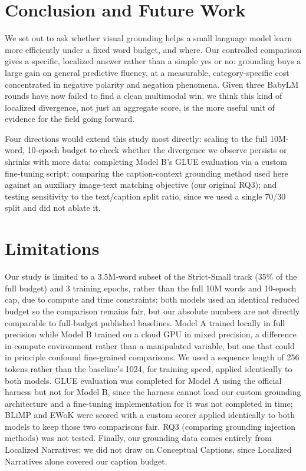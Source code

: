 \documentclass[11pt]{article}
\begin{document}
\section{Conclusion and Future Work}
\label{sec:conclusion}
We set out to ask whether visual grounding helps a small language model learn more efficiently under a fixed word budget, and where. Our controlled comparison gives a specific, localized answer rather than a simple yes or no: grounding buys a large gain on general predictive fluency, at a measurable, category-specific cost concentrated in negative polarity and negation phenomena. Given three BabyLM rounds have now failed to find a clean multimodal win, we think this kind of localized divergence, not just an aggregate score, is the more useful unit of evidence for the field going forward.

Four directions would extend this study most directly: scaling to the full 10M-word, 10-epoch budget to check whether the divergence we observe persists or shrinks with more data; completing Model B's GLUE evaluation via a custom fine-tuning script; comparing the caption-context grounding method used here against an auxiliary image-text matching objective (our original RQ3); and testing sensitivity to the text/caption split ratio, since we used a single 70/30 split and did not ablate it.

\section*{Limitations}
\label{sec:limitations}
Our study is limited to a 3.5M-word subset of the Strict-Small track (35\% of the full budget) and 3 training epochs, rather than the full 10M words and 10-epoch cap, due to compute and time constraints; both models used an identical reduced budget so the comparison remains fair, but our absolute numbers are not directly comparable to full-budget published baselines. Model A trained locally in full precision while Model B trained on a cloud GPU in mixed precision, a difference in compute environment rather than a manipulated variable, but one that could in principle confound fine-grained comparisons. We used a sequence length of 256 tokens rather than the baseline's 1024, for training speed, applied identically to both models. GLUE evaluation was completed for Model A using the official harness but not for Model B, since the harness cannot load our custom grounding architecture and a fine-tuning implementation for it was not completed in time; BLiMP and EWoK were scored with a custom scorer applied identically to both models to keep those two comparisons fair. RQ3 (comparing grounding injection methods) was not tested. Finally, our grounding data comes entirely from Localized Narratives; we did not draw on Conceptual Captions, since Localized Narratives alone covered our caption budget.
\end{document}

